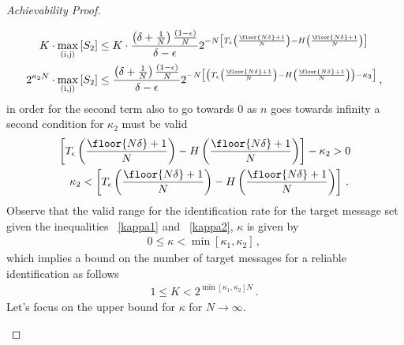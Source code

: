 \begin{proof}[Achievability Proof]
\begin{itemize}
\begin{enumerate}
\begin{align}
 K \cdot \underset{(\text{i},\text{j})}{\max}\left[ S_2 \right]  &\leq K \cdot \frac{\left(\delta+\frac{1}{N}\right)\frac{(1-\epsilon)}{N}}{\delta - \epsilon} 2^{-N\left[T_\epsilon\left(\frac{\floor{N\delta}+1}{N}\right)-H\left(\frac{\floor{N\delta}+1}{N}\right)\right]} 
 \nonumber \\
 2^{\kappa_2 N} \cdot \underset{(\text{i},\text{j})}{\max} \left[ S_2 \right]  &\leq \frac{\left(\delta+\frac{1}{N}\right)\frac{(1-\epsilon)}{N}}{\delta - \epsilon} 2^{-N\left[\left(T_\epsilon\left(\frac{\floor{N\delta}+1}{N}\right)-H\left(\frac{\floor{N\delta}+1}{N}\right)\right)-\kappa_2\right]} \,,\,
\end{align}
in order for the second term also to go towards $0$ as $n$ goes towards infinity a second condition for $\kappa_2$ must be valid
\begin{align}
 \left[T_\epsilon\left(\frac{\floor{N\delta}+1}{N}\right)-H\left(\frac{\floor{N\delta}+1}{N}\right)\right]-\kappa_2 > 0 
    \nonumber \\
 \label{kappa2}  
    \kappa_2 < \left[T_\epsilon\left(\frac{\floor{N\delta}+1}{N}\right)-H\left(\frac{\floor{N\delta}+1}{N}\right)\right]\,.\,
\end{align}
Observe that the valid range for the identification rate for the target message set given the inequalities ~\eqref{kappa1} and ~\eqref{kappa2}, $\kappa$ is given by
\begin{align}
\label{range.kappa}
    0 \leq \kappa<\min\left[\kappa_1, \kappa_2 \right] \,,\,
\end{align}
which implies a bound on the number of target messages for a reliable identification as follows
\begin{align}
    1 \leq K < 2^{\min\left[\kappa_1, \kappa_2 \right]N} \,.\,
\end{align}
Let's focus on the upper bound for $\kappa$ for $N \to \infty$.


\end{enumerate}
\end{itemize}
\end{proof}
